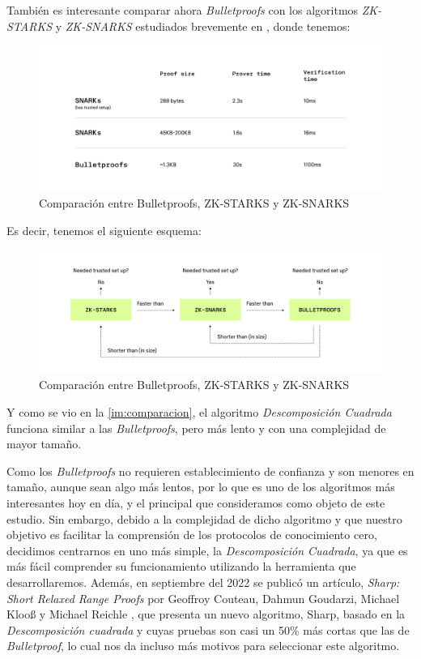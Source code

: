 También es interesante comparar ahora \emph{Bulletproofs} con los algoritmos \emph{ZK-STARKS} y \emph{ZK-SNARKS} estudiados brevemente en , donde tenemos:
\begin{figure}[H]
    \centering
    \includegraphics[width=\textwidth]{images/comparison2.png}
    \caption{Comparación entre Bulletproofs, ZK-STARKS y ZK-SNARKS \cite{Comparacion}}
\end{figure}

Es decir, tenemos el siguiente esquema:
\begin{figure}[H]
    \centering
    \includegraphics[width=\textwidth]{images/comparison.png}
    \caption{Comparación entre Bulletproofs, ZK-STARKS y ZK-SNARKS \cite{Comparacion}}
\end{figure}

Y como se vio en la \autoref{im:comparacion}, el algoritmo \emph{Descomposición Cuadrada} funciona similar a las \emph{Bulletproofs}, pero más lento y con una complejidad de mayor tamaño.

Como los \emph{Bulletproofs} no requieren establecimiento de confianza y son menores en tamaño, aunque sean algo más lentos, por lo que es uno de los algoritmos más interesantes hoy en día, y el principal que consideramos como objeto de este estudio. Sin embargo, debido a la complejidad de dicho algoritmo y que nuestro objetivo es facilitar la comprensión de los protocolos de conocimiento cero, decidimos centrarnos en uno más simple, la \emph{Descomposición Cuadrada}, ya que es más fácil comprender su funcionamiento utilizando la herramienta que desarrollaremos. Además, en septiembre del 2022 se publicó un artículo, \emph{Sharp: Short Relaxed Range Proofs} por Geoffroy Couteau, Dahmun Goudarzi, Michael Klooß y
Michael Reichle \cite{Sharp}, que presenta un nuevo algoritmo, Sharp, basado en la \emph{Descomposición cuadrada} y cuyas pruebas son casi un 50\% más cortas que las de \emph{Bulletproof}, lo cual nos da incluso más motivos para seleccionar este algoritmo.

